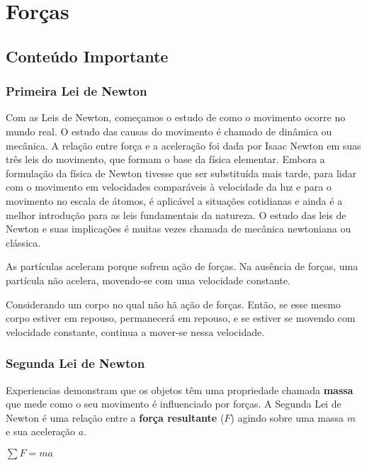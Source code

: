\section{Forças}
\subsection{Conteúdo Importante}
\subsubsection{Primeira Lei de Newton}

Com as Leis de Newton, começamos o estudo de como o movimento ocorre no mundo real. O estudo das causas do movimento é chamado de dinâmica ou mecânica. A relação entre força e a aceleração foi dada por Isaac Newton em suas três leis do movimento, que formam o base da física elementar. Embora a formulação da física de Newton tivesse que ser substituída mais tarde, para lidar com o movimento em velocidades comparáveis à velocidade da luz e para o movimento no escala de átomos, é aplicável a situações cotidianas e ainda é a melhor introdução para as leis fundamentais da natureza. O estudo das leis de Newton e suas implicações é muitas vezes chamada de mecânica newtoniana ou clássica.

As partículas aceleram porque sofrem ação de forças. Na ausência de forças, uma partícula não acelera, movendo-se com uma velocidade constante.

\begin{definition} Considerando um corpo no qual não hã ação de forças. Então, se esse mesmo corpo estiver em repouso, permanecerá em repouso, e se estiver se movendo com velocidade constante, continua a mover-se nessa velocidade.
\end{definition}

\subsubsection{Segunda Lei de Newton}
Experiencias demonstram que os objetos têm uma propriedade chamada \textbf{massa} que mede como o seu movimento é influenciado por forças. A Segunda Lei de Newton é uma relação entre a \textbf{força resultante} ($F$) agindo sobre uma massa $m$ e sua aceleração $a$.

\begin{definition} $\sum F=ma$
\end{definition}

